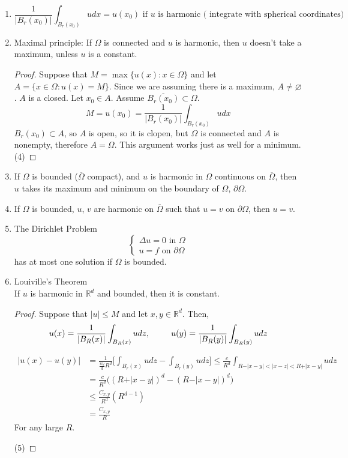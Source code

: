 \documentclass[12pt]{article}
\let\emptyset\varnothing
\begin{document}
\begin{enumerate}[itemsep=0pt, parsep=0pt, topsep=0pt, partopsep=0pt]
\item 
$$ \frac{1}{\vert B_r(x_0)\vert} \int_{B_r(x_0)} u dx = u (x_0) \text{ if } u \text{ is harmonic ( integrate with spherical coordinates)}$$
\item Maximal principle: If $\Omega$ is connected and $u$ is harmonic, then $u$ doesn't take a maximum, unless $u$ is a constant. 
\begin{proof}
Suppose that $M=\max\{u(x): x\in \Omega \}$ and let $A=\{x \in \Omega : u(x)=M\}$. Since we are assuming there is a maximum, $A \not = \emptyset$. $A$ is a closed. Let $x_0 \in A$. Assume $\overline{B_r(x_0)} \subset \Omega$.
$$M=u(x_0) = \frac{1}{\vert B_r(x_0)\vert } \int_{B_r(x_0)} u dx$$
$B_r(x_0) \subset A$, so $A$ is open, so it is clopen, but $\Omega$ is connected and $A$ is nonempty, therefore $A=\Omega$. This argument works just as well for a minimum.  
(4)
\end{proof}
\item If $\Omega$ is bounded ($\overline{\Omega}$ compact), and $u$ is harmonic in $\Omega$ continuous on $\overline{\Omega}$, then $u$ takes its maximum and minimum on the boundary of $\Omega$, $\partial \Omega$. 
\item If $\Omega$ is bounded, $u$, $v$ are harmonic on $\overline{\Omega}$ such that $u = v$ on $\partial \Omega$, then $u=v$. 
\item The Dirichlet Problem
$$\begin{cases}
\Delta u = 0 \text{ in } \Omega \\
u = f \text{ on } \partial \Omega
\end{cases} $$
has at most one solution if $\Omega$ is bounded. 
\item Louiville's Theorem \\
If $u$ is harmonic in $\mathbb{R}^d$ and bounded, then it is constant. 
\begin{proof}
Suppose that $\vert u \vert \leq M$ and let $x,y\in \mathbb{R}^d$. Then,
$$u(x) = \frac{1}{\vert B_R(x)\vert} \int_{B_R(x)} u dz, \hspace*{25pt} u(y) = \frac{1}{\vert B_R(y)\vert} \int_{B_R(y)} u dz$$

\begin{align*}
\vert u(x)-u(y) \vert &= \frac{1}{\frac{w_d}{d}R^d} \Big[ \int_{B_r(x)} u dz - \int_{B_r(y)} u dz\Big] \leq \frac{c}{R^d} \int_{R-\vert x-y \vert < \vert x-z \vert < R + \vert x -y\vert } u dz \\
&= \frac{c}{R^d}\Big((R+\vert x-y\vert)^d - (R-\vert x - y \vert)^d\Big) \\
&\leq \frac{C_{x,y}}{R^d}(R^{d-1}) \\
&= \frac{C_{x,y}}{R}
\end{align*}
For any large $R$. 

(5)
\end{proof}
\end{enumerate}
\end{document}
